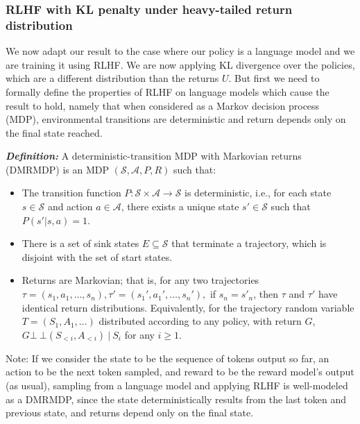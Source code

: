 \documentclass{article}
\begin{document}
\hypertarget{theorem-about-RLHF-with-KL-penalty}{%
\subsubsection{RLHF with KL penalty under heavy-tailed return distribution}}

We now adapt our result to the case where our policy is a language model and we are training it using RLHF. We are now applying KL divergence over the policies, which are a different distribution than the returns $U$. But first we need to formally define the properties of RLHF on language models which cause the result to hold, namely that when considered as a Markov decision process (MDP), environmental transitions are deterministic and return depends only on the final state reached.

\textbf{\emph{Definition:}} A deterministic-transition MDP with
Markovian returns (DMRMDP) is an MDP \((\mathcal S, \mathcal A, P, R)\)
such that:

\begin{itemize}
\item
  The transition function
  \(P: \mathcal{S} \times \mathcal{A} \to \mathcal{S}\) is
  deterministic, i.e., for each state \(s \in \mathcal{S}\) and action
  \(a \in \mathcal{A}\), there exists a unique state
  \(s' \in \mathcal{S}\) such that \(P(s' | s, a) = 1\).
\item
  There is a set of sink states \(E \subseteq \mathcal S\) that
  terminate a trajectory, which is disjoint with the set of start
  states.
\item
  Returns are Markovian; that is, for any two trajectories
  \(\tau=(s_1, a_1, \dots, s_n), \tau'=(s_1', a_1', \dots, s_n'),\) if
  \(s_{n}= s'_{n}\), then \(\tau\) and \(\tau'\) have identical return
  distributions. Equivalently, for the trajectory random variable
  \(T=(S_1, A_1, \dots)\) distributed according to any policy, with
  return \(G\), \(G \bot\!\!\!\!\!\ \bot (S_{<i}, A_{<i}) \ |\ S_i\) for
  any \(i \ge 1\).
\end{itemize}

Note: If we consider the state to be the sequence of tokens output so far, an action to be the next token sampled, and reward to be the reward model's output (as usual), sampling from a language model and applying RLHF is well-modeled
as a DMRMDP, since the state deterministically results from the last token and previous state, and returns depend only on the final state.
\end{document}

